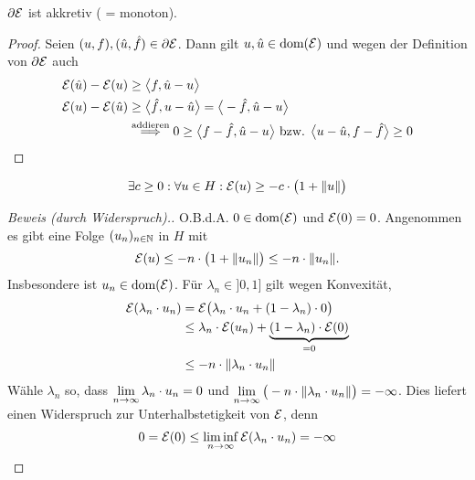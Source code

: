 \begin{lemma}
$\partial\mathcal{E}$ ist akkretiv ( = monoton).
\end{lemma}
\begin{proof}
Seien $(u,f),(\hat{u},\hat{f})\in\partial\mathcal{E}$. Dann gilt $u,\hat{u}\in\text{dom}(\mathcal{E})$ und wegen der Definition von $\partial\mathcal{E}$ auch
\begin{align*}
\mathcal{E}(\hat{u})-\mathcal{E}(u)&\geq\big\langle f,\hat{u}-u\big\rangle\\
\mathcal{E}(u)-\mathcal{E}(\hat{u})&\geq\big\langle \hat{f},u-\hat{u}\big\rangle=\big\langle-\hat{f},\hat{u}-u\big\rangle\\
&\stackrel{\text{addieren}}{\implies}
0\geq\big\langle f-\hat{f},\hat{u}-u\big\rangle
\text{ bzw. }
\big\langle u-\hat{u},f-\hat{f}\big\rangle\geq0
\end{align*}
\end{proof}

\begin{lemma}\label{lemma1.3.2}
\begin{align*}
\exists c\geq0:\forall u\in H:\mathcal{E}(u)\geq -c\cdot\big(1+\Vert u\Vert\big)
\end{align*}
\end{lemma}
\begin{proof}[Beweis (durch Widerspruch).]\enter
O.B.d.A. $0\in\text{dom}(\mathcal{E})$ und $\mathcal{E}(0)=0$. Angenommen es gibt eine Folge $(u_n)_{n\in\mathbb{N}}$ in $H$ mit
\begin{align*}
\mathcal{E}(u)\leq -n\cdot\big(1+\Vert u_n\Vert\big)\leq -n\cdot\Vert u_n\Vert.
\end{align*}
Insbesondere ist $u_n\in\text{dom}(\mathcal{E})$. Für $\lambda_n\in]0,1]$ gilt wegen Konvexität,
\begin{align*}
\mathcal{E}(\lambda_n\cdot u_n)
&=\mathcal{E}\big(\lambda_n\cdot u_n+(1-\lambda_n)\cdot 0\big)\\
&\leq\lambda_n\cdot\mathcal{E}(u_n)+\underbrace{(1-\lambda_n)\cdot\mathcal{E}(0)}_{=0}\\
&\leq- n\cdot\Vert\lambda_n\cdot u_n\Vert
\end{align*}
Wähle $\lambda_n$ so, dass $\lim\limits_{n\to\infty}\lambda_n\cdot u_n=0$ und $\lim\limits_{n\to\infty}\big(-n\cdot\Vert\lambda_n\cdot u_n\Vert\big)=-\infty$. Dies liefert einen Widerspruch zur Unterhalbstetigkeit von $\mathcal{E}$, denn
\begin{align*}
0=\mathcal{E}(0)\leq\liminf\limits_{n\to\infty}\mathcal{E}(\lambda_n\cdot u_n)=-\infty
\end{align*}
\end{proof}

